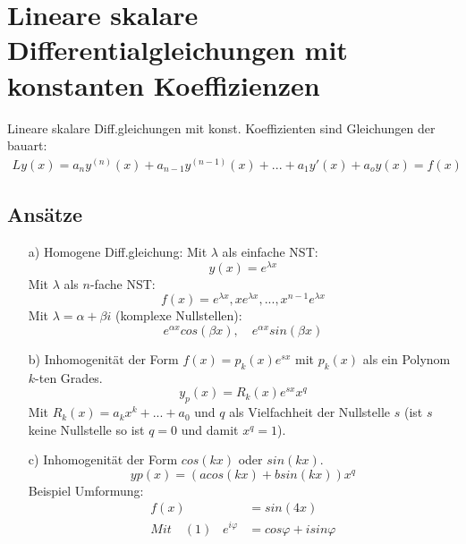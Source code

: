 \section{Lineare skalare Differentialgleichungen mit konstanten Koeffizienzen}
  \begin{definition}
    Lineare skalare Diff.gleichungen mit konst. Koeffizienten sind Gleichungen der bauart:
    \begin{align*}
      Ly(x) = a_n y^{(n)}(x)+a_{n-1}y^{(n-1)}(x)+...+a_1y'(x) + a_o y(x) = f(x)
    \end{align*}
  \end{definition}
  \subsection{Ansätze}
  \begin{itemize}
    \item[a)] Homogene Diff.gleichung:
    Mit $\lambda$ als einfache NST:
    \begin{equation}
      y(x) = e^{\displaystyle\lambda x} \label{eq:dgl_Ansatz_a}
    \end{equation}
    Mit $\lambda$ als $n$-fache NST:
    \begin{equation}
      f(x) = e^{\displaystyle\lambda x}, xe^{\displaystyle\lambda x}, ..., x^{n-1}e^{\displaystyle\lambda x} 
    \end{equation}
    Mit $\lambda = \alpha + \beta i$ (komplexe Nullstellen):
    \begin{equation}
      e^{\alpha x}cos(\beta x),\quad e^{\alpha x} sin(\beta x)
    \end{equation}
    \item[b)] Inhomogenität der Form $f(x) = p_k(x) e^{sx}$ mit $p_k(x)$ als ein Polynom $k$-ten Grades.
    \begin{equation}
      y_p(x) = R_k(x)e^{sx}x^q
    \end{equation}
    Mit $R_k(x) = a_kx^k+...+a_0$ und $q$ als Vielfachheit der Nullstelle $s$ (ist $s$ keine Nullstelle so ist $q = 0$ und damit $x^q = 1$).
    \item[c)] Inhomogenität der Form $cos(kx)$ oder $sin(kx)$.
    \begin{equation}
      yp(x) = (a cos(kx) + b sin(kx)) x^q
    \end{equation}
    Beispiel Umformung:
    \begin{align}
      f(x) &= sin(4x)\nonumber\\
      Mit \quad
      (1)\;\;\; e^{i\varphi} &= cos \varphi + i sin\varphi\nonumber \\

\end{align}
\end{itemize}
